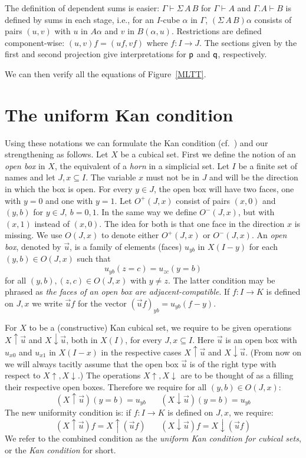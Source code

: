 \documentclass[10pt,a4paper]{article}
\newcommand{\pp}{{\sf p}}
\newcommand{\qq}{{\sf q}}
\newcommand{\rup}[1]{#1{\uparrow}}
\newcommand{\rdo}[1]{#1{\downarrow}}
\begin{document}
The definition of dependent sums is easier: $\Gamma\vdash\Sigma\,A\,B$
for $\Gamma \vdash A$ and $\Gamma.A \vdash B$ is defined by sums in
each stage, i.e., for an $I$-cube $\alpha$ in $\Gamma$,
$(\Sigma\,A\,B)\alpha$ consists of pairs $(u,v)$ with $u$ in $A
\alpha$ and $v$ in $B (\alpha, u)$.  Restrictions are defined
component-wise: $(u,v)f = (u f, v f)$ where $f \colon I \to J$.  The
sections given by the first and second projection give interpretations
for $\pp$ and $\qq$, respectively.

We can then verify all the equations of Figure~\ref{MLTT}.

\section{The uniform Kan condition}

 Using these notations we can formulate the Kan condition (cf.\ \cite{Kan})
and our strengthening as follows. Let $X$ be a cubical set.
First we define the notion of an \emph{open box} in $X$, the equivalent of a \emph{horn} in a simplicial set.
Let $I$ be a finite set of names and let $J,x \subseteq I$.
The variable $x$ must not be in $J$ and will be the direction in which the box is open.
For every $y\in J$, the open box will have two faces, one with $y=0$ and one with $y=1$.
Let $O^+(J,x)$ consist of pairs $(x,0)$ and $(y,b)$ for $y\in J,~b=0,1$.
In the same way we define $O^-(J,x)$, but with $(x,1)$ instead of $(x,0)$.
The idea for both is that one face in the direction $x$ is missing.
We use $O(J,x)$ to denote either $O^+(J,x)$ or $O^-(J,x)$.
An \emph{open box}, denoted by $\vec u$, is a family of elements (faces)
$u_{yb}$ in $X(I-y)$ for each $(y,b)\in O(J,x)$ such that 
$$u_{yb}(z = c) = u_{zc}(y = b)$$
for all $(y,b),(z,c)\in O(J,x)$ with $y\neq z$. 
The latter condition may be phrased as 
\emph{the faces of an open box are adjacent-compatible}.
If $f:I\to K$ is defined on $J,x$ we write
$\vec u f$ for the vector $(\vec u f)_{yb} = u_{yb} (f-y)$.

 For $X$ to be a (constructive) Kan cubical set, we require to be given operations
$\rup{X} \vec u$ and $\rdo{X} \vec u$, both in $X(I)$, for every $J,x\subseteq I$.
Here $\vec u$ is an open box with $u_{x0}$ and $u_{x1}$ in $X(I-x)$ in the
respective cases $\rup{X} \vec u$ and $\rdo{X} \vec u$. (From now on we will always
tacitly assume that the open box $\vec u$ is of the right type with respect to $\rup{X},\rdo{X}$.)
The operations $\rup{X},\rdo{X}$ are to be thought of as a filling their
respective open boxes. Therefore we require for all $(y,b)\in O(J,x)$:
$$
(\rup{X} \vec u) (y=b) = u_{yb}~~~~~~~~(\rdo{X} \vec u) (y=b) = u_{yb}
$$
The new uniformity condition is: if $f:I\to K$ is defined on $J,x$, we require:
$$
(\rup{X} \vec u) f = \rup{X} (\vec{u}f)~~~~~~~~(\rdo{X} \vec u) f = \rdo{X} (\vec{u}f)
$$
We refer to the combined condition as the \emph{uniform Kan condition for cubical sets},
or the \emph{Kan condition} for short. %
\end{document}
